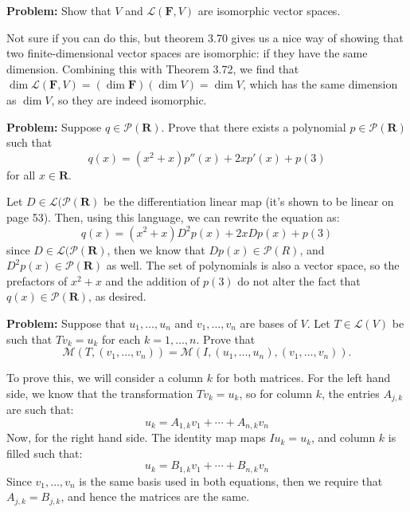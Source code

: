 \documentclass[10pt]{article}
\renewcommand{\R}{\mathbf R}
\newcommand{\F}{\mathbf F}
\newenvironment{problem}{\textbf{Problem:}}{}
\begin{document}
	\begin{problem}
		Show that \( V \) and \( \mathcal L(\F, V) \) are isomorphic vector spaces. 
	\end{problem}

	\begin{solution}
		Not sure if you can do this, but theorem 3.70 gives us a nice way of showing that two finite-dimensional 
		vector spaces are isomorphic: if they have the same dimension. Combining this with Theorem 3.72, we 
		find that \( \dim \mathcal L(\F, V) = (\dim \F) (\dim V) = \dim V\), which has the same dimension as 
		\( \dim V \), so they are indeed isomorphic. 

	\end{solution}

	\begin{problem}
		Suppose \( q \in \mathcal P(\R) \). Prove that there exists a polynomial \( p \in \mathcal P(\R) \) such 
		that 
		\[
		q(x) = (x^2 + x)p''(x) + 2xp'(x) + p(3)
		\] 
		for all \( x\in \R \). 
	\end{problem}

	\begin{solution}
		Let \( D \in \mathcal L(\mathcal P(\R) \) be the differentiation linear map (it's shown to be 
		linear on page 53). Then, using this language, 
		we can rewrite the equation as:
		\[
		q(x) = (x^2 + x) D^2 p(x) + 2xDp(x) + p(3)
		\] 
		since \( D \in \mathcal L(\mathcal P(\R) \), then we know that \( Dp(x) \in \mathcal P(R) \), and 
		\( D^2 p(x) \in \mathcal P(\R) \) as well. The set of polynomials is also a vector space, so 
		the prefactors of \( x^2 + x \) and the addition of  \( p(3) \) do not alter the fact that 
		\( q(x) \in \mathcal P(\R) \), as desired. 
	\end{solution}

	\begin{problem}
		Suppose that \( u_1, \dots, u_n \) and \( v_1, \dots, v_n \) are bases of \( V \). Let 
		\( T \in \mathcal L(V)  \) be such that \( Tv_k = u_k \) for each \( k = 1,\dots, n \). Prove that 
		\[
		\mathcal M(T, (v_1, \dots, v_n)) = \mathcal M(I, (u_1, \dots, u_n), (v_1, \dots, v_n)). 
		\] 
	\end{problem}

	\begin{solution}
		To prove this, we will consider a column \( k \) for both matrices. For the left hand side, we know that 
		the transformation \( Tv_k = u_k \), so for column \( k \), the entries \( A_{j, k} \) are such that:
		\[
		u_k = A_{1, k}v_1 + \cdots + A_{n, k}v_n
		\] 
		Now, for the right hand side. The identity map maps  \( Iu_k = u_k \), and column \( k \) is filled such 
		that:
		\[
		u_k = B_{1, k}v_1 + \cdots + B_{n, k}v_n
		\] 
		Since \( v_1, \dots, v_n \) is the same basis used in both equations, then we require that \( A_{j, k} = 
		B_{j, k}\), and hence the matrices are the same. 
	\end{solution}
\end{document}

